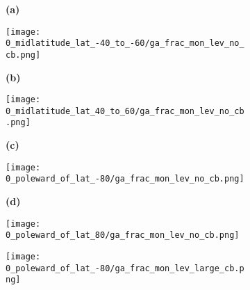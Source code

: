 \documentclass[preview]{standalone}
\begin{document}
\begin{figure}

  \begin{subfigure}[t]{0.05\textwidth}
    \textbf{\normalsize{(a)}}
  \end{subfigure}
  \begin{subfigure}[t]{0.45\textwidth}
    \texttt{[image: 0\_midlatitude\_lat\_-40\_to\_-60/ga\_frac\_mon\_lev\_no\_cb.png]}
  \end{subfigure}
  \begin{subfigure}[t]{0.05\textwidth}
    \textbf{\normalsize{(b)}}
  \end{subfigure}
  \begin{subfigure}[t]{0.45\textwidth}
    \texttt{[image: 0\_midlatitude\_lat\_40\_to\_60/ga\_frac\_mon\_lev\_no\_cb.png]}
  \end{subfigure}

  \begin{subfigure}[t]{0.05\textwidth}
    \textbf{\normalsize{(c)}}
  \end{subfigure}
  \begin{subfigure}[t]{0.45\textwidth}
    \texttt{[image: 0\_poleward\_of\_lat\_-80/ga\_frac\_mon\_lev\_no\_cb.png]}
  \end{subfigure}
  \begin{subfigure}[t]{0.05\textwidth}
    \textbf{\normalsize{(d)}}
  \end{subfigure}
  \begin{subfigure}[t]{0.45\textwidth}
    \texttt{[image: 0\_poleward\_of\_lat\_80/ga\_frac\_mon\_lev\_no\_cb.png]}
  \end{subfigure}

  \begin{subfigure}[t]{0.05\textwidth}
    \hfill
  \end{subfigure}
  \begin{subfigure}[t]{0.95\textwidth}
    \texttt{[image: 0\_poleward\_of\_lat\_-80/ga\_frac\_mon\_lev\_large\_cb.png]}
  \end{subfigure}

\end{figure}
\end{document}
